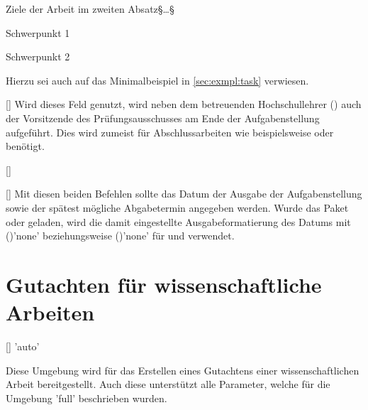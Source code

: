 \begin{Bundle*}{}
\begin{Example}
\begin{Code}[escapechar=§]
{  Ziele der Arbeit im zweiten Absatz§\dots§
}{%
  \item Schwerpunkt 1
  \item Schwerpunkt 2
}
\end{Code}
Hierzu sei auch auf das Minimalbeispiel in \autoref{sec:exmpl:task} verwiesen.
%
\end{Example}

\begin{Declaration}{[]}
\printdeclarationlist%
%
Wird dieses Feld genutzt, wird neben dem betreuenden Hochschullehrer 
() auch der Vorsitzende des Prüfungsausschusses am Ende der 
Aufgabenstellung aufgeführt. Dies wird zumeist für Abschlussarbeiten wie 
beispielsweise \masterthesisname{} oder \diplomathesisname{} benötigt.
\end{Declaration}

\begin{Declaration}{[]}
\begin{Declaration}{[]}
\printdeclarationlist%
%
Mit diesen beiden Befehlen sollte das Datum der Ausgabe der Aufgabenstellung 
sowie der spätest mögliche Abgabetermin angegeben werden. Wurde das Paket 
 oder  geladen, wird die damit eingestellte 
Ausgabeformatierung des Datums mit ()'none' 
beziehungsweise ()'none' für  
und   verwendet.
\end{Declaration}
\end{Declaration}


\section{Gutachten für wissenschaftliche Arbeiten}
%
%
\begin{Declaration}{[]}{%
  'auto'%
}
\begin{Declaration}{%
}
\begin{Declaration}{}
\printdeclarationlist%
%
Diese Umgebung wird für das Erstellen eines Gutachtens einer wissenschaftlichen 
Arbeit bereitgestellt. Auch diese unterstützt alle Parameter, welche für die 
Umgebung 'full' beschrieben wurden.


\end{Declaration}
\end{Declaration}
\end{Declaration}
\end{Bundle*}
